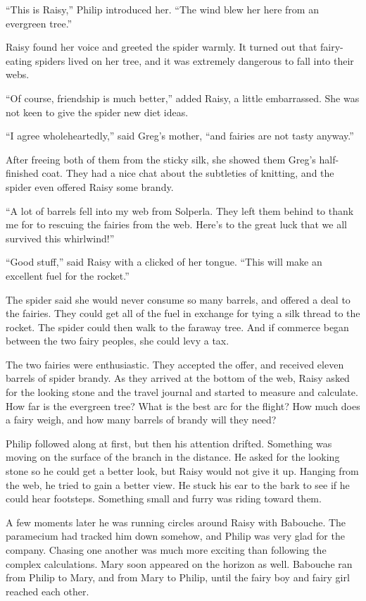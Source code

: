 \documentclass[10pt, draft]{memoir}
\begin{document}
``This is Raisy,'' Philip introduced her. ``The wind blew her here from an
evergreen tree.''

Raisy found her voice and greeted the spider warmly. It turned out that
fairy-eating spiders lived on her tree, and it was extremely dangerous to fall
into their webs.

``Of course, friendship is much better,'' added Raisy, a little embarrassed.
She was not keen to give the spider new diet ideas.

``I agree wholeheartedly,'' said Greg's mother, ``and fairies are not tasty
anyway.''

After freeing both of them from the sticky silk, she showed them Greg's
half-finished coat. They had a nice chat about the subtleties of knitting, and
the spider even offered Raisy some brandy.

``A lot of barrels fell into my web from Solperla. They left them behind to
thank me for to rescuing the fairies from the web. Here's to the great luck
that we all survived this whirlwind!''

``Good stuff,'' said Raisy with a clicked of her tongue. ``This will make an
excellent fuel for the rocket.''

The spider said she would never consume so many barrels, and offered a deal to
the fairies. They could get all of the fuel in exchange for tying a silk thread
to the rocket. The spider could then walk to the faraway tree. And if commerce
began between the two fairy peoples, she could levy a tax.

The two fairies were enthusiastic. They accepted the offer, and received eleven
barrels of spider brandy. As they arrived at the bottom of the web, Raisy asked
for the looking stone and the travel journal and started to measure and
calculate. How far is the evergreen tree? What is the best arc for the flight?
How much does a fairy weigh, and how many barrels of brandy will they need?

Philip followed along at first, but then his attention drifted. Something was
moving on the surface of the branch in the distance. He asked for the looking
stone so he could get a better look, but Raisy would not give it up. Hanging
from the web, he tried to gain a better view. He stuck his ear to the bark to
see if he could hear footsteps. Something small and furry was riding toward
them.

A few moments later he was running circles around Raisy with Babouche. The
paramecium had tracked him down somehow, and Philip was very glad for the
company. Chasing one another was much more exciting than following the complex
calculations. Mary soon appeared on the horizon as well. Babouche ran from
Philip to Mary, and from Mary to Philip, until the fairy boy and fairy girl
reached each other.
\end{document}
